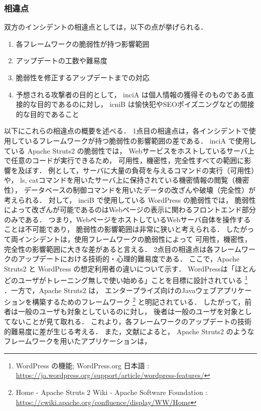 \documentclass[uplatex]{jsarticle}
\begin{document}
\subsubsection*{相違点}
双方のインシデントの相違点としては，以下の点が挙げられる．
\begin{enumerate}
    \item 各フレームワークの脆弱性が持つ影響範囲
    \item アップデートの工数や難易度
    \item 脆弱性を修正するアップデートまでの対応
    \item 予想される攻撃者の目的として，
    inciA は個人情報の獲得そのものである直接的な目的であるのに対し，
    icniB は愉快犯やSEOポイズニングなどの間接的な目的であること
\end{enumerate}
以下にこれらの相違点の概要を述べる．
1点目の相違点は，各インシデントで使用しているフレームワークが持つ脆弱性の影響範囲の差である．
inciA で使用している Apache Struts2 の脆弱性では，
Webサービスをホストしているサーバ上で任意のコードが実行できるため，
可用性，機密性，完全性すべての範囲に影響を及ぼす．
例として，サーバに大量の負荷を与えるコマンドの実行（可用性）や，
ls, catコマンドを用いたサーバ上に保持されている機密情報の閲覧（機密性），
データベースの制御コマンドを用いたデータの改ざんや破壊（完全性）が考えられる．
対して， inciB で使用している WordPress の脆弱性では，
脆弱性によって改ざんが可能であるのはWebページの表示に関わるフロントエンド部分のみである．
つまり，WebページをホストしているWebサーバ自体を操作することは不可能であり，
脆弱性の影響範囲は非常に狭いと考えられる．
したがって両インシデントは，使用フレームワークの脆弱性によって
可用性，機密性，完全性の影響範囲に大きな差があると言える．
2点目の相違点は各フレームワークのアップデートにおける技術的・心理的難易度である．
ここで，Apache Struts2 と WordPress の想定利用者の違いについて示す．
WordPressは「ほとんどのユーザがトレーニング無しで使い始める」ことを目標に設計されている
\footnote{
    WordPress の機能; WordPress.org 日本語
    : \url{https://ja.wordpress.org/support/article/wordpress-features/}
}
．一方で，Apache Struts2 は，
エンタープライズ向けのJavaウェブアプリケーションを構築するためのフレームワーク
\footnote{
    Home - Apache Struts 2 Wiki - Apache Software Foundation
    : \url{https://cwiki.apache.org/confluence/display/WW/Home}
}
と明記されている．
したがって，前者は一般のユーザも対象としているのに対し，
後者は一般のユーザを対象としてないことが見て取れる．
これより，各フレームワークのアップデートの技術的難易度に差が生じる考える．
また，文献\cite{do_developers}によると，
Apache Struts2 のようなフレームワークを用いたアプリケーションは，
\end{document}
